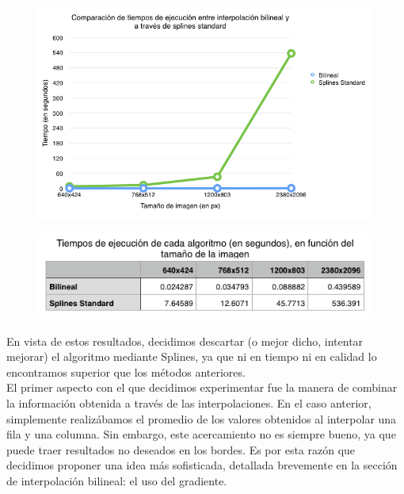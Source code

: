 \documentclass[a4paper]{article}
\begin{document}
\begin{figure}[h!]
    \begin{center}
    \includegraphics[scale=0.65]{imagenes/tiempos/bistdg.png}
    \label{tiemposrang}
  \end{center}
\end{figure}
\pagebreak
\begin{figure}[h!]
    \begin{center}
    \includegraphics[scale=0.70]{imagenes/tiempos/bistdt.png}
    \label{tiempos1}
  \end{center}
\end{figure}

En vista de estos resultados, decidimos descartar (o mejor dicho, intentar mejorar) el algoritmo mediante Splines, ya que ni en tiempo ni en calidad lo encontramos superior que los métodos anteriores.\\

El primer aspecto con el que decidimos experimentar fue la manera de combinar la información obtenida a través de las interpolaciones. En el caso anterior, simplemente realizábamos el promedio de los valores obtenidos al interpolar una fila y una columna. Sin embargo, este acercamiento no es siempre bueno, ya que puede traer resultados no deseados en los bordes. Es por esta razón que decidimos proponer una idea más sofisticada, detallada brevemente en la sección de interpolación bilineal: el uso del gradiente. \\
\end{document}
